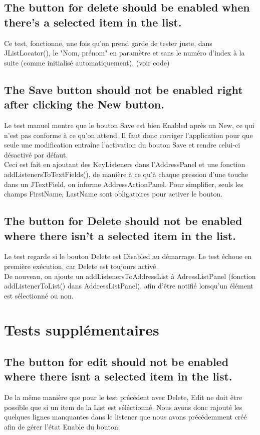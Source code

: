 \documentclass[a4paper,oneside,frenchb,12pt]{article}
\begin{document}
\subsection{The button for delete should be enabled when there's a selected item in the list.}
Ce test, fonctionne, une fois qu'on prend garde de tester juste, 
dans JListLocator(), le "Nom, prénom" en paramètre et sans le numéro 
d'index à la suite (comme initialisé automatiquement). (voir code)\\

\subsection{The Save button should not be enabled right after clicking the New button.}
Le test manuel montre que le bouton Save est bien Enabled après un New, 
ce qui n'est pas conforme à ce qu'on attend. Il faut donc corriger l'application pour que seule une modification entraîne l'activation du bouton Save et rendre celui-ci désactivé par défaut.\\

Ceci est fait en ajoutant des KeyListeners dans l'AddressPanel et une fonction 
addListenersToTextFields(), de manière à ce qu'à chaque pression d'une touche dans un JTextField, on informe AddressActionPanel. Pour simplifier, seuls les champs FirstName, LastName 
sont obligatoires pour activer le bouton.\\

\subsection{The button for Delete should not be enabled where there isn't a selected item in the list.}
Le test regarde si le bouton Delete est Disabled au démarrage. 
Le test échoue en première exécution, car Delete est toujours activé.\\

De nouveau, on ajoute un addListenersToAddressList à AdressListPanel 
(fonction addListenerToList() dans AddressListPanel), afin d'être notifié 
lorsqu'un élément est sélectionné ou non.

\section{Tests supplémentaires}

\subsection{The button for edit should not be enabled where there isnt a selected item in the list.}
De la même manière que pour le test précédent avec Delete, Edit ne doit être 
possible que si un item de la List est séléctionné. Nous avons donc rajouté 
les quelques lignes manquantes dans le listener que nous avons précédemment 
créé afin de gérer l'état Enable du bouton.
\end{document}

